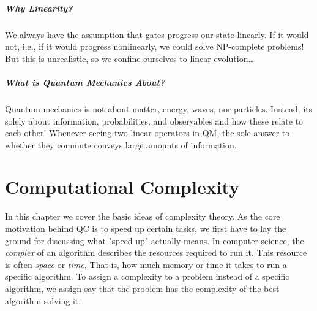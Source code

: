		\paragraph{Why Linearity?}
			We always have the assumption that gates progress our state linearly. If it would not, i.e., if it would progress nonlinearly, we could solve NP-complete problems! But this is unrealistic, so we confine ourselves to linear evolution\dots

		\paragraph{What is Quantum Mechanics About?}
			Quantum mechanics is not about matter, energy, waves, nor particles. Instead, its solely about information, probabilities, and observables and how these relate to each other! Whenever seeing two linear operators in \ac{QM}, the sole answer to whether they commute conveys large amounts of information.

\chapter{Computational Complexity}
	In this chapter we cover the basic ideas of complexity theory. As the core motivation behind \ac{QC} is to speed up certain tasks, we first have to lay the ground for discussing what "speed up" actually means. In computer science, the \emph{complex} of an algorithm describes the resources required to run it. This resource is often \emph{space} or \emph{time.} That is, how much memory or time it takes to run a specific algorithm. To assign a complexity to a problem instead of a specific algorithm, we assign say that the problem has the complexity of the best algorithm solving it.

